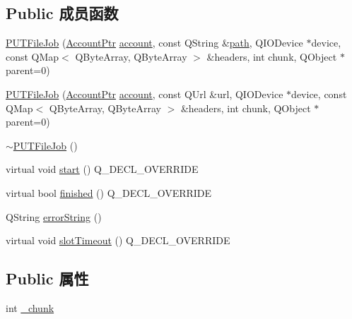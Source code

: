 \subsection*{Public 成员函数}
\begin{DoxyCompactItemize}
\item 
\hyperlink{class_o_c_c_1_1_p_u_t_file_job_abe6f5be9a0e50186f8ca4ac0735d358b}{P\+U\+T\+File\+Job} (\hyperlink{namespace_o_c_c_a848616aedb9188e223c6b9867757fe69}{Account\+Ptr} \hyperlink{class_o_c_c_1_1_abstract_network_job_a469c9d8212a338ad07d1efa1a94f784d}{account}, const Q\+String \&\hyperlink{class_o_c_c_1_1_abstract_network_job_a8ed2423a454ec861c20f6900f5591ef7}{path}, Q\+I\+O\+Device $\ast$device, const Q\+Map$<$ Q\+Byte\+Array, Q\+Byte\+Array $>$ \&headers, int chunk, Q\+Object $\ast$parent=0)
\item 
\hyperlink{class_o_c_c_1_1_p_u_t_file_job_a218efbe1ced27176f246a8622be4ac3b}{P\+U\+T\+File\+Job} (\hyperlink{namespace_o_c_c_a848616aedb9188e223c6b9867757fe69}{Account\+Ptr} \hyperlink{class_o_c_c_1_1_abstract_network_job_a469c9d8212a338ad07d1efa1a94f784d}{account}, const Q\+Url \&url, Q\+I\+O\+Device $\ast$device, const Q\+Map$<$ Q\+Byte\+Array, Q\+Byte\+Array $>$ \&headers, int chunk, Q\+Object $\ast$parent=0)
\item 
\hyperlink{class_o_c_c_1_1_p_u_t_file_job_a1187329dcae74fc1a3231e15956b139c}{$\sim$\+P\+U\+T\+File\+Job} ()
\item 
virtual void \hyperlink{class_o_c_c_1_1_p_u_t_file_job_aae253a07a04a91cc89e2a4c97d86b3f8}{start} () Q\+\_\+\+D\+E\+C\+L\+\_\+\+O\+V\+E\+R\+R\+I\+DE
\item 
virtual bool \hyperlink{class_o_c_c_1_1_p_u_t_file_job_aeca049817cfb255d038f4bc7faf0a204}{finished} () Q\+\_\+\+D\+E\+C\+L\+\_\+\+O\+V\+E\+R\+R\+I\+DE
\item 
Q\+String \hyperlink{class_o_c_c_1_1_p_u_t_file_job_a35f718aea247b85f83a7761ce2e77195}{error\+String} ()
\item 
virtual void \hyperlink{class_o_c_c_1_1_p_u_t_file_job_ae41b6685eff585073f72b7dfae5868e2}{slot\+Timeout} () Q\+\_\+\+D\+E\+C\+L\+\_\+\+O\+V\+E\+R\+R\+I\+DE
\end{DoxyCompactItemize}
\subsection*{Public 属性}
\begin{DoxyCompactItemize}
\item 
int \hyperlink{class_o_c_c_1_1_p_u_t_file_job_aa10f6923befe5632249e181be64f33a7}{\+\_\+chunk}
\end{DoxyCompactItemize}
